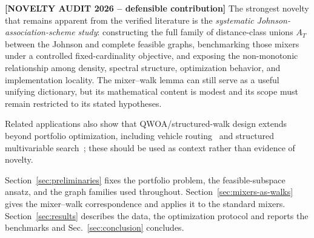 {\color{red}\textbf{[NOVELTY AUDIT 2026 -- defensible contribution]} The strongest novelty that remains apparent from the verified literature is the \emph{systematic Johnson-association-scheme study}: constructing the full family of distance-class unions $A_T$ between the Johnson and complete feasible graphs, benchmarking those mixers under a controlled fixed-cardinality objective, and exposing the non-monotonic relationship among density, spectral structure, optimization behavior, and implementation locality. The mixer--walk lemma can still serve as a useful unifying dictionary, but its mathematical content is modest and its scope must remain restricted to its stated hypotheses.}

Related applications also show that QWOA/structured-walk design extends beyond portfolio optimization, including vehicle routing~\cite{Bennett2021} and structured multivariable search~\cite{Matwiejew2023}; these should be used as context rather than evidence of novelty.

Section~\ref{sec:preliminaries} fixes the portfolio problem, the
feasible-subspace ansatz, and the graph families used throughout.
    Section~\ref{sec:mixers-as-walks} gives the mixer--walk correspondence and applies it to the
    standard mixers. Section~\ref{sec:results} describes the data, the optimization protocol and reports the
    benchmarks and Sec.~\ref{sec:conclusion} concludes.